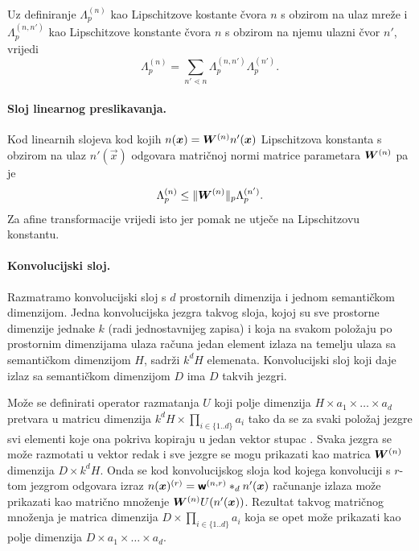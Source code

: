 \documentclass[utf8, seminar, numeric, lmodern]{feri}
\begin{document}
Uz definiranje $\Lambda_p^{(n)}$ kao Lipschitzove kostante čvora $n$ s obzirom na ulaz mreže i $\Lambda_p^{(n,n')}$ kao Lipschitzove konstante čvora $n$ s obzirom na njemu ulazni čvor $n'$, vrijedi \cite{cisse17-pn}
\begin{equation}
\Lambda_p^{(n)} = \sum_{n'\lessdot n}
\Lambda_p^{(n,n')}\Lambda_p^{(n')}.
\end{equation}

\paragraph{Sloj linearnog preslikavanja.} Kod linearnih slojeva kod kojih $n(\bm{x})=\bm{W}^{(n)}n'(\bm{x})$ Lipschitzova konstanta s obzirom na ulaz $n'(\vec x)$ odgovara matričnoj normi matrice parametara $\bm{W}^{(n)}$ pa je 
\begin{equation}
\Lambda_p^{(n)} \leq \lVert \bm{W}^{(n)}\rVert_p\Lambda_p^{(n')}.
\end{equation}
Za afine transformacije vrijedi isto jer pomak ne utječe na Lipschitzovu konstantu.

\paragraph{Konvolucijski sloj.} Razmatramo konvolucijski sloj s $d$ prostornih dimenzija i jednom semantičkom dimenzijom. Jedna konvolucijska jezgra takvog sloja, kojoj su sve prostorne dimenzije jednake $k$ (radi jednostavnijeg zapisa) i koja na svakom položaju po prostornim dimenzijama ulaza računa jedan element izlaza na temelju ulaza sa semantičkom dimenzijom $H$, sadrži $k^dH$ elemenata. Konvolucijski sloj koji daje izlaz sa semantičkom dimenzijom $D$ ima $D$ takvih jezgri. 

Može se definirati operator razmatanja $U$ koji polje dimenzija $H\times a_1\times\dots\times a_d$ pretvara u matricu dimenzija $k^dH\times \prod_{i\in\{1..d\}}a_i$ tako da se za svaki položaj jezgre svi elementi koje ona pokriva kopiraju u jedan vektor stupac \cite{sharan-epdl}. Svaka jezgra se može razmotati u vektor redak i sve jezgre se mogu prikazati kao matrica $\bm{W}^{(n)}$ dimenzija $D\times k^dH$. Onda se kod konvolucijskog sloja kod kojega konvoluciji s $r$-tom jezgrom odgovara izraz $n(\bm{x})^{(r)} = \bm{\mathsf{w}}^{(n,r)}*_d n'(\bm{x})$ računanje izlaza može prikazati kao matrično množenje $\bm{W}^{(n)}U(n'(\bm{x}))$. Rezultat takvog matričnog množenja je matrica dimenzija $D\times \prod_{i\in\{1..d\}}a_i$ koja se opet može prikazati kao polje dimenzija $D\times a_1\times\dots\times a_d$. 
\end{document}
